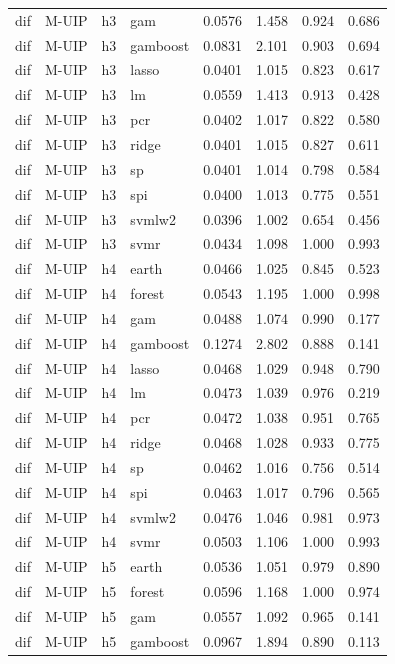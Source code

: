 \begin{ThreePartTable}
\begin{longtable}[t]{llclcccc}
dif & M-UIP & h3 & gam & 0.0576 & 1.458 & 0.924 & 0.686\\
dif & M-UIP & h3 & gamboost & 0.0831 & 2.101 & 0.903 & 0.694\\
dif & M-UIP & h3 & lasso & 0.0401 & 1.015 & 0.823 & 0.617\\
dif & M-UIP & h3 & lm & 0.0559 & 1.413 & 0.913 & 0.428\\
dif & M-UIP & h3 & pcr & 0.0402 & 1.017 & 0.822 & 0.580\\
dif & M-UIP & h3 & ridge & 0.0401 & 1.015 & 0.827 & 0.611\\
dif & M-UIP & h3 & sp & 0.0401 & 1.014 & 0.798 & 0.584\\
dif & M-UIP & h3 & spi & 0.0400 & 1.013 & 0.775 & 0.551\\
dif & M-UIP & h3 & svmlw2 & 0.0396 & 1.002 & 0.654 & 0.456\\
dif & M-UIP & h3 & svmr & 0.0434 & 1.098 & 1.000 & 0.993\\
\addlinespace
dif & M-UIP & h4 & earth & 0.0466 & 1.025 & 0.845 & 0.523\\
dif & M-UIP & h4 & forest & 0.0543 & 1.195 & 1.000 & 0.998\\
dif & M-UIP & h4 & gam & 0.0488 & 1.074 & 0.990 & 0.177\\
dif & M-UIP & h4 & gamboost & 0.1274 & 2.802 & 0.888 & 0.141\\
dif & M-UIP & h4 & lasso & 0.0468 & 1.029 & 0.948 & 0.790\\
dif & M-UIP & h4 & lm & 0.0473 & 1.039 & 0.976 & 0.219\\
dif & M-UIP & h4 & pcr & 0.0472 & 1.038 & 0.951 & 0.765\\
dif & M-UIP & h4 & ridge & 0.0468 & 1.028 & 0.933 & 0.775\\
dif & M-UIP & h4 & sp & 0.0462 & 1.016 & 0.756 & 0.514\\
dif & M-UIP & h4 & spi & 0.0463 & 1.017 & 0.796 & 0.565\\
dif & M-UIP & h4 & svmlw2 & 0.0476 & 1.046 & 0.981 & 0.973\\
dif & M-UIP & h4 & svmr & 0.0503 & 1.106 & 1.000 & 0.993\\
\addlinespace
dif & M-UIP & h5 & earth & 0.0536 & 1.051 & 0.979 & 0.890\\
dif & M-UIP & h5 & forest & 0.0596 & 1.168 & 1.000 & 0.974\\
dif & M-UIP & h5 & gam & 0.0557 & 1.092 & 0.965 & 0.141\\
dif & M-UIP & h5 & gamboost & 0.0967 & 1.894 & 0.890 & 0.113\\

\end{longtable}
\end{ThreePartTable}
